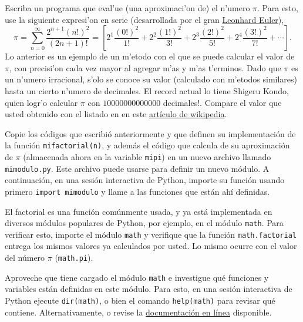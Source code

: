 \documentclass[11pt]{exam}
\begin{document}
\begin{questions}
\item Escriba un programa que eval'ue (una aproximaci'on de) el n'umero $\pi$. Para esto, use la siguiente expresi'on en serie (desarrollada por el gran \href{https://es.wikipedia.org/wiki/Leonhard_Euler}{Leonhard Euler}),
\begin{equation}
\pi = \sum_{n=0}^{\infty}\frac{2^{n+1}(n!)^2}{(2n+1)!}=\left[2^1\frac{(0!)^2}{1!} + 2^2\frac{(1!)^2}{3!} + 2^3\frac{(2!)^2}{5!} + 2^4 \frac{(3!)^2}{7!} + \cdots \right].
\end{equation}
Lo anterior es un ejemplo de un m'etodo con el que se puede calcular el valor de $\pi$, con precisi'on cada vez mayor al agregar m'as y m'as t'erminos. Dado que $\pi$ es un n'umero irracional, s'olo se conoce su valor (calculado con m'etodos similares) hasta un cierto n'umero de decimales. El record actual lo tiene Shigeru Kondo, quien logr'o calcular $\pi$ con $10 000 000 000 000$ decimales!. Compare el valor que usted obtenido con el listado en en este \href{https://es.wikipedia.org/wiki/N\%C3\%BAmero_pi}{art\'iculo de wikipedia}.

\item Copie los códigos que escribió anteriormente y que definen su implementación de  la función \texttt{mifactorial(n)}, y además el código que calcula de su aproximación de $\pi$ (almacenada ahora en la variable \texttt{mipi}) en un nuevo archivo llamado \texttt{mimodulo.py}. Este archivo puede usarse para definir un nuevo módulo. A continuación, en una sesión interactiva de Python, importe su función usando primero \texttt{import mimodulo} y llame a las funciones que están ahí definidas. 

\item El factorial es una función comúnmente usada, y ya está implementada en diversos módulos populares de Python, por ejemplo, en el módulo \texttt{math}. Para verificar esto, importe el módulo \texttt{math} y verifique que la función \texttt{math.factorial} entrega los mismos valores ya calculados por usted. Lo mismo ocurre con el valor del número $\pi$ (\texttt{math.pi}). 

\item Aproveche que tiene cargado el módulo \texttt{math} e investigue qué funciones y variables están definidas en este módulo. Para esto, en una sesión interactiva de Python ejecute \texttt{dir(math)}, o bien el comando \texttt{help(math)} para revisar qué contiene. Alternativamente, o revise la \href{https://docs.python.org/3/library/math.html}{documentaci\'on en l\'inea} disponible.


\end{questions}
\end{document}
